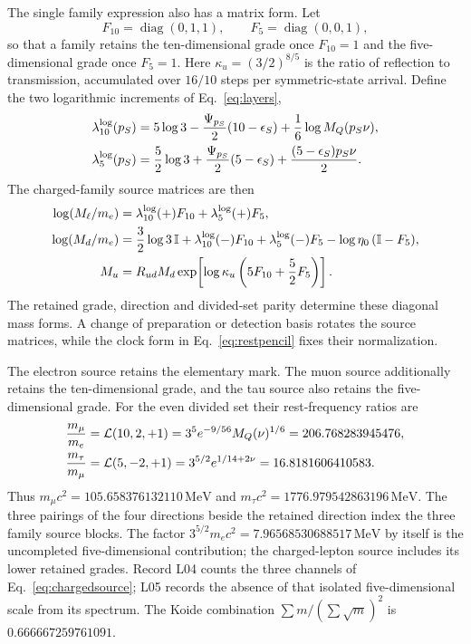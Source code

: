 \documentclass[aps,prx,onecolumn,10pt,notitlepage,nofootinbib,longbibliography]{revtex4-2}
\numberwithin{equation}{section}
\numberwithin{table}{section}
\newcommand{\Id}{\mathbb I}
\newcommand{\diag}{\operatorname{diag}}
\newcommand{\MeV}{\,\mathrm{MeV}}
\begin{document}
The single family expression also has a matrix form. Let
\begin{equation}
 F_{10}=\diag(0,1,1),\qquad F_5=\diag(0,0,1),
\end{equation}
so that a family retains the ten-dimensional grade once $F_{10}=1$ and the five-dimensional grade once $F_5=1$. Here $\kappa_u=(3/2)^{8/5}$ is the ratio of reflection to transmission, accumulated over $16/10$ steps per symmetric-state arrival. Define the two logarithmic increments of Eq.~\eqref{eq:layers},
\begin{align}
 \lambda_{10}^{\log}(p_S)&=5\log3-\frac{\Psi_{p_S}}{2}(10-\epsilon_S)
       +\frac16\log M_Q(p_S\nu),\notag\\
 \lambda_5^{\log}(p_S)&=\frac52\log3+\frac{\Psi_{p_S}}{2}(5-\epsilon_S)
       +\frac{(5-\epsilon_S)p_S\nu}{2}.
\end{align}
The charged-family source matrices are then
\begin{align}
 \log(M_\ell/m_e)&=\lambda_{10}^{\log}(+)F_{10}+\lambda_5^{\log}(+)F_5,\notag\\
 \log(M_d/m_e)&=\frac32\log3\,\Id+\lambda_{10}^{\log}(-)F_{10}
       +\lambda_5^{\log}(-)F_5-\log\eta_0\,(\Id-F_5),\notag\\
 M_u&=R_{ud}M_d\exp\!\left[\log\kappa_u\left(5F_{10}+\frac52F_5\right)\right].
 \label{eq:chargedsource}
\end{align}
The retained grade, direction and divided-set parity determine these diagonal mass forms. A change of preparation or detection basis rotates the source matrices, while the clock form in Eq.~\eqref{eq:restpencil} fixes their normalization.

The electron source retains the elementary mark. The muon source additionally retains the ten-dimensional grade, and the tau source also retains the five-dimensional grade. For the even divided set their rest-frequency ratios are
\begin{align}
 \frac{m_\mu}{m_e}
 &=\mathcal L(10,2,+1)=3^5e^{-9/56}M_Q(\nu)^{1/6}
 =206.768283945476,\notag\\
 \frac{m_\tau}{m_\mu}
 &=\mathcal L(5,-2,+1)=3^{5/2}e^{1/14+2\nu}
 =16.8181606410583.
 \label{eq:leptons}
\end{align}
Thus $m_\mu c^2=105.658376132110\MeV$ and $m_\tau c^2=1776.979542863196\MeV$. The three pairings of the four directions beside the retained direction index the three family source blocks. The factor $3^{5/2}m_ec^2=7.96568530688517\MeV$ by itself is the uncompleted five-dimensional contribution; the charged-lepton source includes its lower retained grades. Record L04 counts the three channels of Eq.~\eqref{eq:chargedsource}; L05 records the absence of that isolated five-dimensional scale from its spectrum. The Koide combination $\sum m/(\sum\sqrt m)^2$ is $0.666667259761091$.
\end{document}
